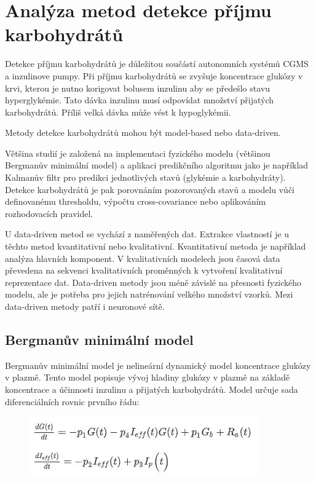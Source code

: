 \chapter{Analýza metod detekce příjmu karbohydrátů}

Detekce příjmu karbohydrátů je důležitou součástí autonomních systémů CGMS a inzulinove pumpy. Při příjmu karbohydrátů se zvyšuje koncentrace glukózy v krvi, kterou je nutno korigovat bolusem inzulinu aby se předešlo stavu hyperglykémie. Tato dávka inzulinu musí odpovídat množství přijatých karbohydrátů. Příliš velká dávka může vést k hypoglykémii.

Metody detekce karbohydrátů mohou být model-based nebo data-driven.

Většina studií je založená na implementaci fyzického modelu (většinou Bergmanův minimální model) a aplikaci predikčního algoritmu jako je například Kalmanův filtr pro predikci jednotlivých stavů (glykémie a karbohydráty). Detekce karbohydrátů je pak porovnáním pozorovaných stavů a modelu vůči definovanému thresholdu, výpočtu cross-covariance nebo aplikováním rozhodovacích pravidel.

U data-driven metod se vychází z naměřených dat. Extrakce vlastností je u těchto metod kvantitativní nebo kvalitativní. Kvantitativní metoda je například analýza hlavních komponent. V kvalitativních modelech jsou časová data převedena na sekvenci kvalitativních proměnných k vytvoření kvalitativní reprezentace dat. Data-driven metody jsou méně závislé na přesnosti fyzického modelu, ale je potřeba pro jejich natrénování velkého množství vzorků. Mezi data-driven metody patří i neuronové sítě.

\section{Bergmanův minimální model}

Bergmanův minimální model je nelineární dynamický model koncentrace glukózy v plazmě. Tento model popisuje vývoj hladiny glukózy v plazmě na základě koncentrace a účinnosti inzulinu a přijatých karbohydrátů. Model určuje sada diferenciálních rovnic prvního řádu:

\begin{figure}[H]{
\label{fig:bergman1}
\includegraphics{img/analyza/bergman1.jpg}}
\end{figure}

